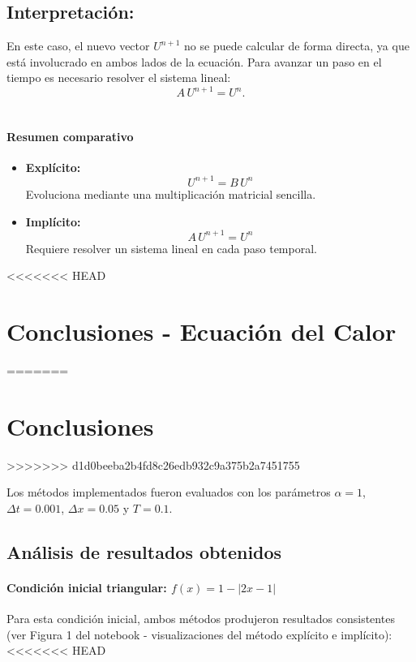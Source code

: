 \documentclass[12pt,a4paper]{article}
\begin{document}
\subsection*{Interpretación:} 
En este caso, el nuevo vector \(U^{n+1}\) no se puede calcular de forma directa, ya que está involucrado en ambos lados de la ecuación.  
Para avanzar un paso en el tiempo es necesario resolver el sistema lineal:
\[
A\,U^{n+1} = U^n.
\] \\

\paragraph{Resumen comparativo}

\begin{itemize}
    \item \textbf{Explícito:}  
    \[
    U^{n+1} = B\,U^n
    \]
    Evoluciona mediante una multiplicación matricial sencilla.
    
    \item \textbf{Implícito:}  
    \[
    A\,U^{n+1} = U^n
    \]
    Requiere resolver un sistema lineal en cada paso temporal.
\end{itemize}

<<<<<<< HEAD
\section{Conclusiones - Ecuación del Calor}
=======
\section{Conclusiones}
>>>>>>> d1d0beeba2b4fd8c26edb932c9a375b2a7451755

Los métodos implementados fueron evaluados con los parámetros $\alpha = 1$, $\Delta t = 0.001$, $\Delta x = 0.05$ y $T = 0.1$.

\subsection{Análisis de resultados obtenidos}

\paragraph{Condición inicial triangular: $f(x) = 1 - |2x - 1|$}

Para esta condición inicial, ambos métodos produjeron resultados consistentes (ver Figura 1 del notebook - visualizaciones del método explícito e implícito):
<<<<<<< HEAD
\end{document}
